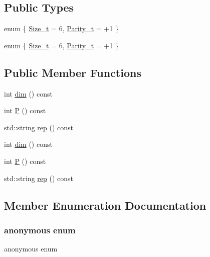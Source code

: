 \subsection*{Public Types}
\begin{DoxyCompactItemize}
\item 
enum \{ \mbox{\hyperlink{structHadron_1_1J5o2gRep_af5e5bb4cf94d285486feba95b28a1faeaa2307d077be17c54313c4ad910f2037a}{Size\+\_\+t}} = 6, 
\mbox{\hyperlink{structHadron_1_1J5o2gRep_af5e5bb4cf94d285486feba95b28a1faea8684223a232485a70569d861adcc1d89}{Parity\+\_\+t}} = +1
 \}
\item 
enum \{ \mbox{\hyperlink{structHadron_1_1J5o2gRep_af5e5bb4cf94d285486feba95b28a1faeaa2307d077be17c54313c4ad910f2037a}{Size\+\_\+t}} = 6, 
\mbox{\hyperlink{structHadron_1_1J5o2gRep_af5e5bb4cf94d285486feba95b28a1faea8684223a232485a70569d861adcc1d89}{Parity\+\_\+t}} = +1
 \}
\end{DoxyCompactItemize}
\subsection*{Public Member Functions}
\begin{DoxyCompactItemize}
\item 
int \mbox{\hyperlink{structHadron_1_1J5o2gRep_a28245b28e8ded3f052453178f8d57da9}{dim}} () const
\item 
int \mbox{\hyperlink{structHadron_1_1J5o2gRep_a6ffd7d1f06f5779fdf3ecdd30a5f0f10}{P}} () const
\item 
std\+::string \mbox{\hyperlink{structHadron_1_1J5o2gRep_aac8af1cb5d895e8c83ccdaa520338573}{rep}} () const
\item 
int \mbox{\hyperlink{structHadron_1_1J5o2gRep_a28245b28e8ded3f052453178f8d57da9}{dim}} () const
\item 
int \mbox{\hyperlink{structHadron_1_1J5o2gRep_a6ffd7d1f06f5779fdf3ecdd30a5f0f10}{P}} () const
\item 
std\+::string \mbox{\hyperlink{structHadron_1_1J5o2gRep_aac8af1cb5d895e8c83ccdaa520338573}{rep}} () const
\end{DoxyCompactItemize}


\subsection{Member Enumeration Documentation}
\mbox{\label{structHadron_1_1J5o2gRep_a565425eaf70ba5d54f8fedbd90dde080}} 
\subsubsection{\texorpdfstring{anonymous enum}{anonymous enum}}
{\footnotesize\ttfamily anonymous enum}

